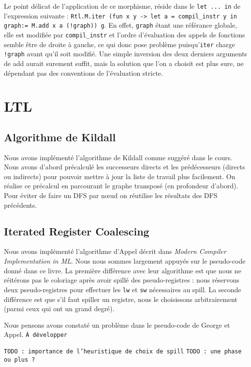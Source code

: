 \documentclass[a4paper]{article}
\begin{document}
Le point délicat de l'application de ce morphisme, réside dans le \texttt{let ... in} de l'expression suivante :
\texttt{Rtl.M.iter (fun x y -> let a = compil\_instr y in graph:= M.add
x a (!graph)) g}. En effet, \texttt{graph} étant une référance globale, elle est
modifiée par \texttt{compil\_instr} et l'ordre d'évaluation des appels
de fonctions semble être de droite à gauche, ce qui donc pose problème
puisqu'\texttt{iter} charge \texttt{!graph} avant qu'il soit modifié. Une simple inversion des
deux derniers arguments de add aurait surement suffit, mais la solution que l'on a choisit est
plus sure, ne dépendant pas des conventions de l'évaluation stricte.
\section{LTL}
\subsection{Algorithme de Kildall}

Nous avons implémenté l'algorithme de Kildall comme suggéré dans le cours. Nous avons d'abord précalculé
les successeurs directs et les prédécesseurs (directs ou indirects) pour pouvoir mettre à jour la liste de
travail plus facilement. On réalise ce précalcul en parcourant le graphe transposé (en profondeur d'abord).
Pour éviter de faire un DFS par nœud on réutilise les résultats des DFS précédents.

\subsection{Iterated Register Coalescing}

Nous avons implémenté l'algorithme d'Appel décrit dans \emph{Modern Compiler Implementation in ML}.
Nous nous sommes largement appuyés sur le pseudo-code donné dans ce livre. La première différence avec
leur algorithme est que nous ne réitérons pas le coloriage après avoir spillé des pseudo-registres :
nous réservons deux pseudo-registres pour effectuer les \texttt{lw} et \texttt{sw} nécessaires au spill.
La seconde différence est que s'il faut spiller un registre, nous le choisissons arbitrairement (parmi ceux
qui ont un grand degré).

Nous pensons avons constaté un problème dans le pseudo-code de George et Appel. \texttt{À développer}

\texttt{TODO : importance de l'heuristique de choix de spill}
\texttt{TODO : une phase ou plus ?}
\end{document}

